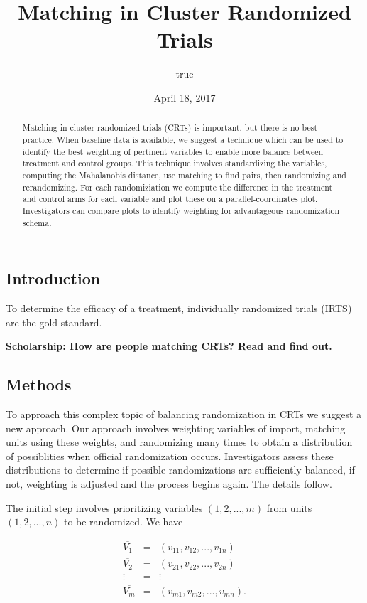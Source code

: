 \documentclass[]{sagej}
\title{Matching in Cluster Randomized Trials}
\author{true}
\date{April 18, 2017}
\begin{document}
\maketitle
\begin{abstract}
Matching in cluster-randomized trials (CRTs) is important, but there is
no best practice. When baseline data is available, we suggest a
technique which can be used to identify the best weighting of pertinent
variables to enable more balance between treatment and control groups.
This technique involves standardizing the variables, computing the
Mahalanobis distance, use matching to find pairs, then randomizing and
rerandomizing. For each randomiziation we compute the difference in the
treatment and control arms for each variable and plot these on a
parallel-coordinates plot. Investigators can compare plots to identify
weighting for advantageous randomization schema.
\end{abstract}

\subsection{Introduction}\label{introduction}

To determine the efficacy of a treatment, individually randomized trials
(IRTS) are the gold standard.

\textbf{Scholarship: How are people matching CRTs? Read and find out.}

\subsection{Methods}\label{methods}

To approach this complex topic of balancing randomization in CRTs we
suggest a new approach. Our approach involves weighting variables of
import, matching units using these weights, and randomizing many times
to obtain a distribution of possiblities when official randomization
occurs. Investigators assess these distributions to determine if
possible randomizations are sufficiently balanced, if not, weighting is
adjusted and the process begins again. The details follow.

The initial step involves prioritizing variables \((1, 2,..., m)\) from
units \((1, 2, ..., n)\) to be randomized. We have

\begin{eqnarray*}
 \overline{V_1} & = & (v_{11}, v_{12},..., v_{1n})\\
 \overline{V_2} & = & (v_{21}, v_{22},..., v_{2n})\\
 \vdots & = & \vdots\\    
 \overline{V_m} & = & (v_{m1}, v_{m2},..., v_{mn}).\\
 \end{eqnarray*}
\end{document}
